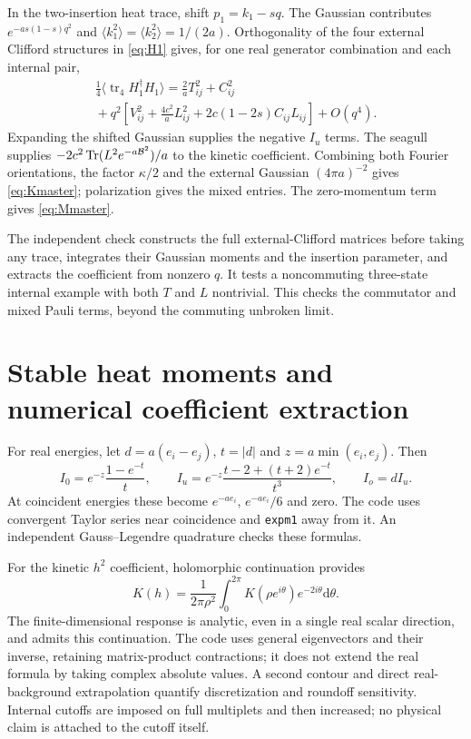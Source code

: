 \documentclass[11pt,letterpaper]{article}
\DeclareMathOperator{\Tr}{Tr}\DeclareMathOperator{\diag}{diag}
\DeclareMathOperator{\tr}{tr}\DeclareMathOperator{\spec}{spec}
\newcommand{\dd}{\mathrm d}\newcommand{\Lam}{\Lambda}
\begin{document}
In the two-insertion heat trace, shift $p_1=k_1-sq$. The Gaussian contributes $e^{-as(1-s)q^2}$ and $\langle k_1^2\rangle=\langle k_2^2\rangle=1/(2a)$. Orthogonality of the four external Clifford structures in \eqref{eq:H1} gives, for one real generator combination and each internal pair,
\begin{multline}
 \frac14\langle\tr_4 H_1^\dagger H_1\rangle
 =\frac2a T_{ij}^2+C_{ij}^2\\
 {}+q^2\left[V_{ij}^2+\frac{4c^2}{a}L_{ij}^2
              +2c(1-2s)C_{ij}L_{ij}\right]+O(q^4).
\end{multline}
Expanding the shifted Gaussian supplies the negative $I_u$ terms. The seagull supplies $-2c^2\Tr(L^2e^{-a\B^2})/a$ to the kinetic coefficient. Combining both Fourier orientations, the factor $\kappa/2$ and the external Gaussian $(4\pi a)^{-2}$ gives \eqref{eq:Kmaster}; polarization gives the mixed entries. The zero-momentum term gives \eqref{eq:Mmaster}.

The independent check constructs the full external-Clifford matrices before taking any trace, integrates their Gaussian moments and the insertion parameter, and extracts the coefficient from nonzero $q$. It tests a noncommuting three-state internal example with both $T$ and $L$ nontrivial. This checks the commutator and mixed Pauli terms, beyond the commuting unbroken limit.

\section{Stable heat moments and numerical coefficient extraction}

For real energies, let $d=a(e_i-e_j)$, $t=|d|$ and $z=a\min(e_i,e_j)$. Then
\begin{equation}
 I_0=e^{-z}\frac{1-e^{-t}}{t},\qquad
 I_u=e^{-z}\frac{t-2+(t+2)e^{-t}}{t^3},\qquad I_o=dI_u.
\end{equation}
At coincident energies these become $e^{-ae_i}$, $e^{-ae_i}/6$ and zero. The code uses convergent Taylor series near coincidence and \texttt{expm1} away from it. An independent Gauss--Legendre quadrature checks these formulas.

For the kinetic $h^2$ coefficient, holomorphic continuation provides
\begin{equation}
 [h^2]K(h)=\frac1{2\pi\rho^2}\int_0^{2\pi}
       K(\rho e^{i\theta})e^{-2i\theta}\dd\theta.
\end{equation}
The finite-dimensional response is analytic, even in a single real scalar direction, and admits this continuation. The code uses general eigenvectors and their inverse, retaining matrix-product contractions; it does not extend the real formula by taking complex absolute values. A second contour and direct real-background extrapolation quantify discretization and roundoff sensitivity. Internal cutoffs are imposed on full multiplets and then increased; no physical claim is attached to the cutoff itself.
\end{document}
